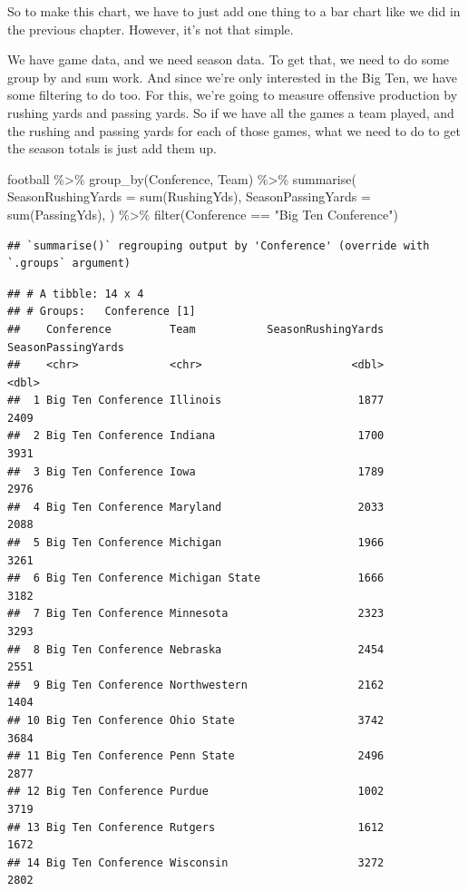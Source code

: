 \documentclass[
]{book}
\newenvironment{Shaded}{\begin{snugshade}}{\end{snugshade}}
\newcommand{\AttributeTok}[1]{\textcolor[rgb]{0.77,0.63,0.00}{#1}}
\newcommand{\FunctionTok}[1]{\textcolor[rgb]{0.00,0.00,0.00}{#1}}
\newcommand{\NormalTok}[1]{#1}
\newcommand{\SpecialCharTok}[1]{\textcolor[rgb]{0.00,0.00,0.00}{#1}}
\newcommand{\StringTok}[1]{\textcolor[rgb]{0.31,0.60,0.02}{#1}}
\begin{document}
So to make this chart, we have to just add one thing to a bar chart like we did in the previous chapter. However, it's not that simple.

We have game data, and we need season data. To get that, we need to do some group by and sum work. And since we're only interested in the Big Ten, we have some filtering to do too. For this, we're going to measure offensive production by rushing yards and passing yards. So if we have all the games a team played, and the rushing and passing yards for each of those games, what we need to do to get the season totals is just add them up.

\begin{Shaded}
\begin{Highlighting}[]
\NormalTok{football }\SpecialCharTok{\%\textgreater{}\%} 
  \FunctionTok{group\_by}\NormalTok{(Conference, Team) }\SpecialCharTok{\%\textgreater{}\%} 
  \FunctionTok{summarise}\NormalTok{(}
    \AttributeTok{SeasonRushingYards =} \FunctionTok{sum}\NormalTok{(RushingYds),}
    \AttributeTok{SeasonPassingYards =} \FunctionTok{sum}\NormalTok{(PassingYds),}
\NormalTok{  ) }\SpecialCharTok{\%\textgreater{}\%} \FunctionTok{filter}\NormalTok{(Conference }\SpecialCharTok{==} \StringTok{"Big Ten Conference"}\NormalTok{)}
\end{Highlighting}
\end{Shaded}

\begin{verbatim}
## `summarise()` regrouping output by 'Conference' (override with `.groups` argument)
\end{verbatim}

\begin{verbatim}
## # A tibble: 14 x 4
## # Groups:   Conference [1]
##    Conference         Team           SeasonRushingYards SeasonPassingYards
##    <chr>              <chr>                       <dbl>              <dbl>
##  1 Big Ten Conference Illinois                     1877               2409
##  2 Big Ten Conference Indiana                      1700               3931
##  3 Big Ten Conference Iowa                         1789               2976
##  4 Big Ten Conference Maryland                     2033               2088
##  5 Big Ten Conference Michigan                     1966               3261
##  6 Big Ten Conference Michigan State               1666               3182
##  7 Big Ten Conference Minnesota                    2323               3293
##  8 Big Ten Conference Nebraska                     2454               2551
##  9 Big Ten Conference Northwestern                 2162               1404
## 10 Big Ten Conference Ohio State                   3742               3684
## 11 Big Ten Conference Penn State                   2496               2877
## 12 Big Ten Conference Purdue                       1002               3719
## 13 Big Ten Conference Rutgers                      1612               1672
## 14 Big Ten Conference Wisconsin                    3272               2802
\end{verbatim}
\end{document}

